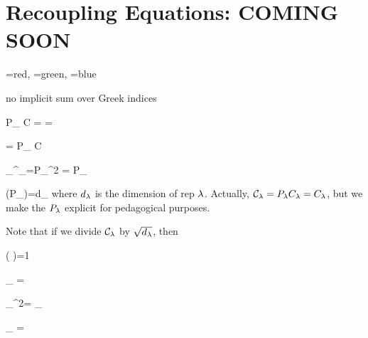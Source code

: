 \chapter{Recoupling Equations: COMING SOON}
\label{ch-recoupling}





\beq
\lam =red,\quad
\mu=green,\quad
\nu=blue
\eeq

no implicit sum over Greek indices

\beq P_\lam
C
=
\bcen
{}
\ecen
=
\bcen
{}
\ecen
\eeq

\beq
\calc\indices{
_\lam
^\nu
^\mu
} = P_\lam
C\indices{
_\lam
^\nu
^\mu
}
\eeq

\beq
\calc_\lam \calc^\dagger_\lam=P_\lam^2 = P_\lam
\eeq

\beq
\tr(P_\lam)=d_\lam
\eeq
where $d_\lambda$ is the dimension of rep $\lambda$.
Actually, ${\cal C}_\lambda=P_\lambda C_\lambda=C_\lambda$,
but we make the $P_\lambda$ explicit
for pedagogical purposes.

Note that if we divide
${\cal C}_\lambda$ by $\sqrt{d_\lambda}$,
then

\beq
\tr\left(\frac{\calc_\lam}
{} 
\frac{\calc^\dagger_\lam}
{} 
\right)=1
\eeq



\beq
{\color{red}\calp_\lam}
=
\bcen
{}
\ecen
\eeq

\beq
\calp_\lam^2=
\calp_\lam
\eeq


\beq
{\color{blue}\calp_\nu}
=
\bcen
{}
\ecen
\eeq

